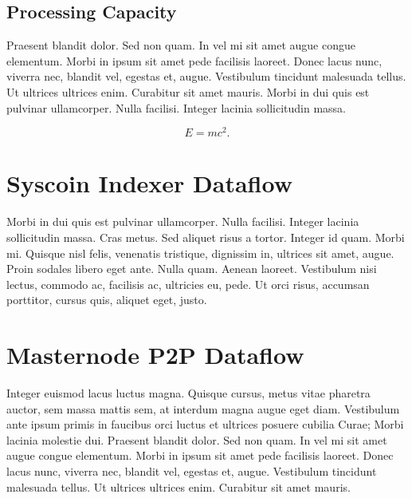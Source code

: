 \documentclass[peerreview]{ieeesyscoin}
\begin{document}
\subsection{Processing Capacity}
Praesent blandit dolor. Sed non quam. In vel mi sit amet augue congue elementum. Morbi in ipsum sit amet pede facilisis laoreet. Donec lacus nunc, viverra nec, blandit vel, egestas et, augue. Vestibulum tincidunt malesuada tellus. Ut ultrices ultrices enim. Curabitur sit amet mauris. Morbi in dui quis est pulvinar ullamcorper. Nulla facilisi. Integer lacinia sollicitudin massa. 

\begin{equation}E=mc^2.\label{eq}\end{equation}


\section{Syscoin Indexer Dataflow}

Morbi in dui quis est pulvinar ullamcorper. Nulla facilisi. Integer lacinia sollicitudin massa. Cras metus. Sed aliquet risus a tortor. Integer id quam. Morbi mi. Quisque nisl felis, venenatis tristique, dignissim in, ultrices sit amet, augue. Proin sodales libero eget ante. Nulla quam. Aenean laoreet. Vestibulum nisi lectus, commodo ac, facilisis ac, ultricies eu, pede. Ut orci risus, accumsan porttitor, cursus quis, aliquet eget, justo. 

\section{Masternode P2P Dataflow}

Integer euismod lacus luctus magna. Quisque cursus, metus vitae pharetra auctor, sem massa mattis sem, at interdum magna augue eget diam. Vestibulum ante ipsum primis in faucibus orci luctus et ultrices posuere cubilia Curae; Morbi lacinia molestie dui. Praesent blandit dolor. Sed non quam. In vel mi sit amet augue congue elementum. Morbi in ipsum sit amet pede facilisis laoreet. Donec lacus nunc, viverra nec, blandit vel, egestas et, augue. Vestibulum tincidunt malesuada tellus. Ut ultrices ultrices enim. Curabitur sit amet mauris. 
\end{document}
